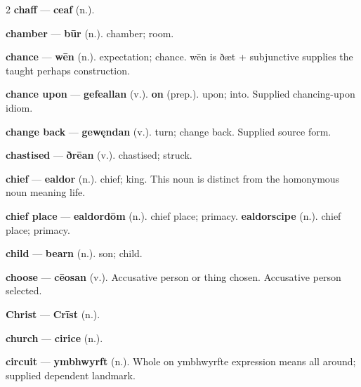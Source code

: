 \begin{multicols}{2}
\textbf{chaff} — \textbf{ceaf} (n.).\par
\textbf{chamber} — \textbf{būr} (n.). chamber; room.\par
\textbf{chance} — \textbf{wēn} (n.). expectation; chance. wēn is ðæt + subjunctive supplies the taught perhaps construction.\par
\textbf{chance upon} — \textbf{gefeallan} (v.).  \textbf{on} (prep.). upon; into. Supplied chancing-upon idiom.\par
\textbf{change back} — \textbf{gewęndan} (v.). turn; change back. Supplied source form.\par
\textbf{chastised} — \textbf{ðrēan} (v.). chastised; struck.\par
\textbf{chief} — \textbf{ealdor} (n.). chief; king. This noun is distinct from the homonymous noun meaning life.\par
\textbf{chief place} — \textbf{ealdordōm} (n.). chief place; primacy. \textbf{ealdorscipe} (n.). chief place; primacy.\par
\textbf{child} — \textbf{bearn} (n.). son; child.\par
\textbf{choose} — \textbf{cēosan} (v.). Accusative person or thing chosen. Accusative person selected.\par
\textbf{Christ} — \textbf{Crīst} (n.).\par
\textbf{church} — \textbf{cirice} (n.).\par
\textbf{circuit} — \textbf{ymbhwyrft} (n.). Whole on ymbhwyrfte expression means all around; supplied dependent landmark.\par

\end{multicols}
